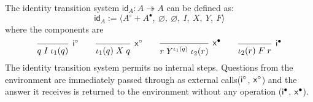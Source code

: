 \documentclass[acmsmall,review,anonymous]{acmart}\settopmatter{printfolios=true,printccs=false,printacmref=false}
\begin{document}
\begin{definition} \label{def:lts-id}

The identity transition system $\mathsf{id}_A : A \twoheadrightarrow A$ can be
defined as:
\[
  \mathsf{id}_A :=
  \langle A^\circ + A^\bullet,\: \varnothing,\: \varnothing,\: I,\: X,\: Y,\: F \rangle
\]
where the components are
\[
  \begin{prooftree}
    \infer0[$\kw{i}^\circ$]{q \mathrel{I} \iota_1(q)}
  \end{prooftree}
  \qquad
  \begin{prooftree}
    \infer0[$\kw{x}^\circ$]{\iota_1(q) \mathrel{X} q}
  \end{prooftree}
  \qquad
  \begin{prooftree}
    \infer0[$\kw{x}^\bullet$]{r \mathrel{Y^{\iota_1(q)}} \iota_2(r)}
  \end{prooftree}
  \qquad
  \begin{prooftree}
    \infer0[$\kw{i}^\bullet$]{\iota_2(r) \mathrel{F} r}
  \end{prooftree}
\]
The identity transition system permits no internal steps. Questions from the
environment are immediately passed through as external calls($ \mathsf{i} ^\circ$,
$ \mathsf{x} ^\circ$) and the answer it receives is returned to the environment
without any operation ($ \mathsf{i} ^\bullet$, $ \mathsf{x} ^\bullet$).

\end{definition}
\end{document}

